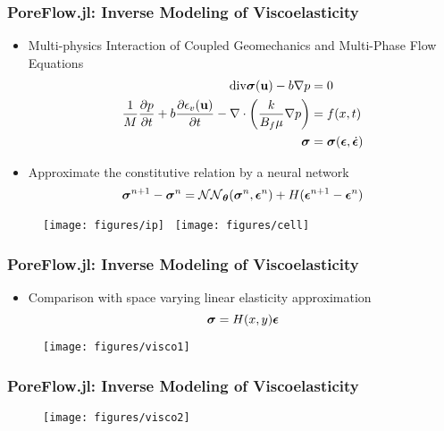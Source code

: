 \documentclass[usenames,dvipsnames]{beamer}
\newcommand{\bt}[0]{\bm{\theta}}
\newcommand{\bu}{\mathbf{u}}
\begin{document}
\begin{frame}
	\frametitle{PoreFlow.jl: Inverse Modeling of Viscoelasticity}
%	
	\begin{itemize}
		\item Multi-physics Interaction of Coupled Geomechanics and Multi-Phase Flow Equations 
{\small
\begin{align*}
\mathrm{div}\bsigma(\bu) - b \nabla p &= 0\\
    \frac{1}{M} \frac{\partial p}{\partial t} + b\frac{\partial \epsilon_v(\bu)}{\partial t} - \nabla\cdot\left(\frac{k}{B_f\mu}\nabla p\right) &= f(x,t)	\\
    	\bsigma &= \bsigma(\bepsilon, \dot\bepsilon)
\end{align*}
}
\item Approximate the constitutive relation by a neural network
{\small
 $$\bsigma^{n+1} - \bsigma^{n} = \mathcal{NN}_{\bt} (\bsigma^n, \bepsilon^n) + H (\bepsilon^{n+1} - \bepsilon^n)$$}
	\end{itemize}		
	\begin{figure}[hbt]	
	\centering
  \texttt{[image: figures/ip]}~
  \texttt{[image: figures/cell]}
\end{figure}

\end{frame}


\begin{frame}
	\frametitle{PoreFlow.jl: Inverse Modeling of Viscoelasticity}
	
	\begin{itemize}
		\item Comparison with space varying linear elasticity approximation
		\begin{equation}
			\bm{\sigma} = H(x, y) \bm{\epsilon}
		\end{equation}
	\end{itemize}
	\begin{figure}[hbt]
  \texttt{[image: figures/visco1]}
\end{figure}

\end{frame}

\begin{frame}
	\frametitle{PoreFlow.jl: Inverse Modeling of Viscoelasticity}
	\begin{figure}[hbt]
  \texttt{[image: figures/visco2]}
\end{figure}

\end{frame}
\end{document}
